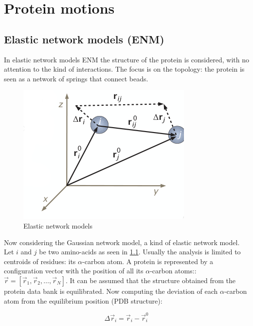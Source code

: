 \graphicspath{{chapters/15/images}}
\chapter{Protein motions}

\section{Elastic network models (ENM)}
In elastic network models ENM the structure of the protein is considered, with no attention to the kind of interactions.
The focus is on the topology: the protein is seen as a network of springs that connect beads.

\begin{figure}[H]
	\includegraphics[width=\textwidth]{enm-theory}
	\caption{Elastic network models}
	\label{fig:enm-theory}
\end{figure}

Now considering the Gaussian network model, a kind of elastic network model.
Let $i$ and $j$ be two amino-acids as seen in \ref{fig:enm-theory}.
Usually the analysis is limited to centroids of residues: its $\alpha$-carbon atom.
A protein is represented by a configuration vector with the position of all its $\alpha$-carbon atoms:: $\vec{r} = [\vec{r}_1, \vec{r}_2, \dots, \vec{r}_N]$.
It can be assumed that the structure obtained from the protein data bank is equilibrated.
Now computing the deviation of each $\alpha$-carbon atom from the equilibrium position (PDB structure):

$$\Delta\vec{r}_i = \vec{r}_i-\vec{r}_i^0$$

